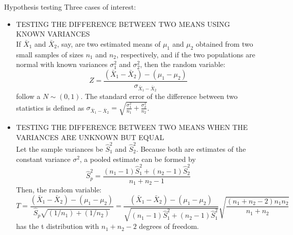 \documentclass[8pt]{beamer}
\renewcommand{\emph}[1]{\textcolor{myorange}{#1}}
\begin{document}
\begin{frame}{Hypothesis testing}
    Three cases of interest:
    \begin{itemize}
        \item \alert{TESTING THE DIFFERENCE BETWEEN TWO MEANS USING KNOWN VARIANCES}\\
            If $\bar{X}_1$ and $\bar{X}_2$, say, are two estimated means of $\mu_1$ and $\mu_2$ obtained from two small samples of sizes $n_1$ and $n_2$, respectively, and if the two populations are normal with known variances $\sigma_1^2$ and $\sigma_2^2$, then the random variable:
            \[
                Z = \frac{(\bar{X}_1 - \bar{X}_2) - (\mu_1 - \mu_2)}{\sigma_{\bar{X}_1 - \bar{X}_2}}
            \]
            follow a $N \sim (0,1)$. The standard error of the difference between two statistics is defined as $\sigma_{\bar{X}_1 - \bar{X}_2} = \sqrt{\frac{\sigma_1^2}{n_1} + \frac{\sigma_2^2}{n_2}}$.


        \item \alert{TESTING THE DIFFERENCE BETWEEN TWO MEANS WHEN THE VARIANCES ARE UNKNOWN BUT EQUAL}\\
            Let the sample variances be $\hat{S}_1^2$ and $\hat{S}_2^2$. Because both are estimates of the constant variance $\sigma^2$, a pooled estimate can be formed by
            \[
                \hat{S}_p^2 = \frac{(n_1 -1)\hat{S}_1^2 + (n_2 -1) \hat{S}_2^2}{n_1 + n_2 -1}
            \]
            Then, the random variable:
            \[
                T = \frac{(\bar{X}_1 - \bar{X}_2) - (\mu_1 - \mu_2)}{\hat{S}_p \sqrt{(1/n_1) + (1/n_2)}} = \frac{(\bar{X}_1 - \bar{X}_2) - (\mu_1 - \mu_2)}{\sqrt{(n_1-1)\hat{S}_1^2 + (n_2-1)\hat{S}_1^2}} \sqrt{\frac{(n_1 + n_2 -2)n_1 n_2}{n_1 + n_2}} 
            \]
            has the \emph{t distribution} with $n_1 + n_2 -2$ degrees of freedom.

    \end{itemize}

\end{frame}
\end{document}
